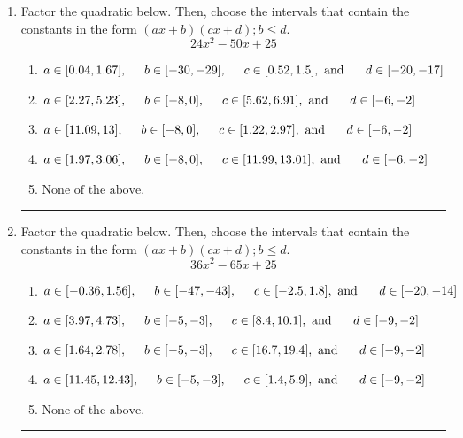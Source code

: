 \documentclass[14pt]{extbook}
\newcommand{\litem}[1]{\item#1\hspace*{-1cm}\rule{\textwidth}{0.4pt}}
\begin{document}
\begin{enumerate}
{\begin{enumerate}[label=\Alph*.]
\end{enumerate} }
\litem{
Factor the quadratic below. Then, choose the intervals that contain the constants in the form $(ax+b)(cx+d); b \leq d.$\[ 24x^{2} -50 x + 25 \]\begin{enumerate}[label=\Alph*.]
\item \( a \in [0.04, 1.67], \hspace*{5mm} b \in [-30, -29], \hspace*{5mm} c \in [0.52, 1.5], \text{ and } \hspace*{5mm} d \in [-20, -17] \)
\item \( a \in [2.27, 5.23], \hspace*{5mm} b \in [-8, 0], \hspace*{5mm} c \in [5.62, 6.91], \text{ and } \hspace*{5mm} d \in [-6, -2] \)
\item \( a \in [11.09, 13], \hspace*{5mm} b \in [-8, 0], \hspace*{5mm} c \in [1.22, 2.97], \text{ and } \hspace*{5mm} d \in [-6, -2] \)
\item \( a \in [1.97, 3.06], \hspace*{5mm} b \in [-8, 0], \hspace*{5mm} c \in [11.99, 13.01], \text{ and } \hspace*{5mm} d \in [-6, -2] \)
\item \( \text{None of the above.} \)

\end{enumerate} }
\litem{
Factor the quadratic below. Then, choose the intervals that contain the constants in the form $(ax+b)(cx+d); b \leq d.$\[ 36x^{2} -65 x + 25 \]\begin{enumerate}[label=\Alph*.]
\item \( a \in [-0.36, 1.56], \hspace*{5mm} b \in [-47, -43], \hspace*{5mm} c \in [-2.5, 1.8], \text{ and } \hspace*{5mm} d \in [-20, -14] \)
\item \( a \in [3.97, 4.73], \hspace*{5mm} b \in [-5, -3], \hspace*{5mm} c \in [8.4, 10.1], \text{ and } \hspace*{5mm} d \in [-9, -2] \)
\item \( a \in [1.64, 2.78], \hspace*{5mm} b \in [-5, -3], \hspace*{5mm} c \in [16.7, 19.4], \text{ and } \hspace*{5mm} d \in [-9, -2] \)
\item \( a \in [11.45, 12.43], \hspace*{5mm} b \in [-5, -3], \hspace*{5mm} c \in [1.4, 5.9], \text{ and } \hspace*{5mm} d \in [-9, -2] \)
\item \( \text{None of the above.} \)


\end{enumerate}}
\end{enumerate}
\end{document}
